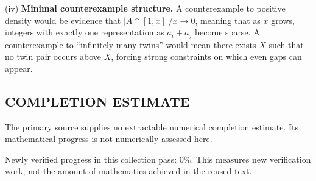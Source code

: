 \smallskip
\noindent (iv) \textbf{Minimal counterexample structure.}
A counterexample to positive density would be evidence that $|A\cap[1,x]|/x\to 0$, meaning that as $x$ grows, integers with exactly one representation as $a_i+a_j$ become sparse. A counterexample to ``infinitely many twins'' would mean there exists $X$ such that no twin pair occurs above $X$, forcing strong constraints on which even gaps can appear.




\subsection*{COMPLETION ESTIMATE}
The primary source supplies no extractable numerical completion estimate. Its mathematical progress is not numerically assessed here.

Newly verified progress in this collection pass: $0\%$. This measures new verification work, not the amount of mathematics achieved in the reused text.
